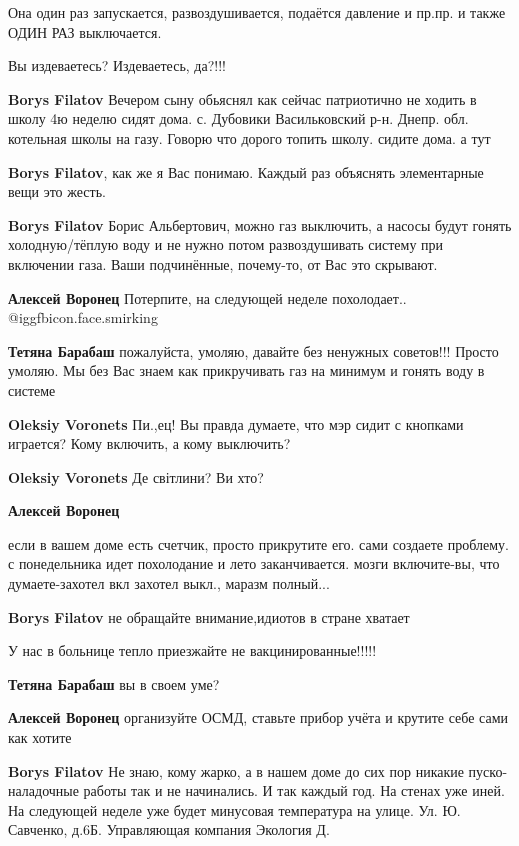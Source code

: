 \begin{itemize}
\begin{itemize}
Она один раз запускается, развоздушивается, подаётся давление и пр.пр. и также
ОДИН РАЗ выключается.

Вы издеваетесь? Издеваетесь, да?!!!

\textbf{Borys Filatov} Вечером сыну обьяснял как сейчас патриотично не ходить в школу 4ю неделю сидят дома.
с. Дубовики Васильковский р-н.
Днепр. обл.
котельная школы на газу.
Говорю что дорого топить школу. сидите дома.
а тут

\textbf{Borys Filatov}, как же я Вас понимаю. Каждый раз объяснять элементарные вещи это жесть.

\textbf{Borys Filatov} Борис Альбертович, можно газ выключить, а насосы будут гонять холодную/тёплую воду и не нужно потом развоздушивать систему при включении газа. Ваши подчинённые, почему-то, от Вас это скрывают.

\textbf{Алексей Воронец} Потерпите, на следующей неделе похолодает..  @igg{fbicon.face.smirking} 

\textbf{Тетяна Барабаш} пожалуйста, умоляю, давайте без ненужных советов!!!
Просто умоляю. Мы без Вас знаем как прикручивать газ на минимум и гонять воду в системе

\textbf{Oleksiy Voronets} Пи.,ец! Вы правда думаете, что мэр сидит с кнопками играется? Кому включить, а кому выключить?

\textbf{Oleksiy Voronets} Де світлини? Ви хто?

\textbf{Алексей Воронец} 

если в вашем доме есть счетчик, просто прикрутите его. сами создаете проблему. с
понедельника идет похолодание и лето заканчивается. мозги включите-вы, что
думаете-захотел вкл захотел выкл., маразм полный...


\textbf{Borys Filatov} не обращайте внимание,идиотов в стране хватает

У нас в больнице тепло приезжайте не вакцинированные!!!!!

\textbf{Тетяна Барабаш} вы в своем уме?

\textbf{Алексей Воронец} организуйте ОСМД, ставьте прибор учёта и крутите себе сами как хотите

\textbf{Borys Filatov} Не знаю, кому жарко, а в нашем доме до сих пор никакие пуско-наладочные работы так и не начинались. И так каждый год. На стенах уже иней. На следующей неделе уже будет минусовая температура на улице. Ул. Ю. Савченко, д.6Б. Управляющая компания Экология Д.


\end{itemize}
\end{itemize}
